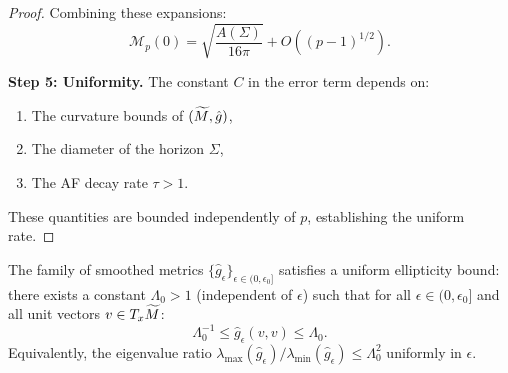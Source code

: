 \begin{proof}
Combining these expansions:
\begin{equation}
    \mathcal{M}_p(0) = \sqrt{\frac{A(\Sigma)}{16\pi}} + O((p-1)^{1/2}).
\end{equation}

\textbf{Step 5: Uniformity.}
The constant $C$ in the error term depends on:
\begin{enumerate}
    \item The curvature bounds of $(\widetilde{M}, \hat{g})$,
    \item The diameter of the horizon $\Sigma$,
    \item The AF decay rate $\tau > 1$.
\end{enumerate}
These quantities are bounded independently of $p$, establishing the uniform rate.
\end{proof}

\begin{lemma}\label{lem:UniformEllipticity}
The family of smoothed metrics $\{\hat{g}_\epsilon\}_{\epsilon \in (0, \epsilon_0]}$ satisfies a uniform ellipticity bound: there exists a constant $\Lambda_0 > 1$ (independent of $\epsilon$) such that for all $\epsilon \in (0, \epsilon_0]$ and all unit vectors $v \in T_x\widetilde{M}$:
\begin{equation}
    \Lambda_0^{-1} \le \hat{g}_\epsilon(v, v) \le \Lambda_0.
\end{equation}
Equivalently, the eigenvalue ratio $\lambda_{\max}(\hat{g}_\epsilon)/\lambda_{\min}(\hat{g}_\epsilon) \le \Lambda_0^2$ uniformly in $\epsilon$.
\end{lemma}

